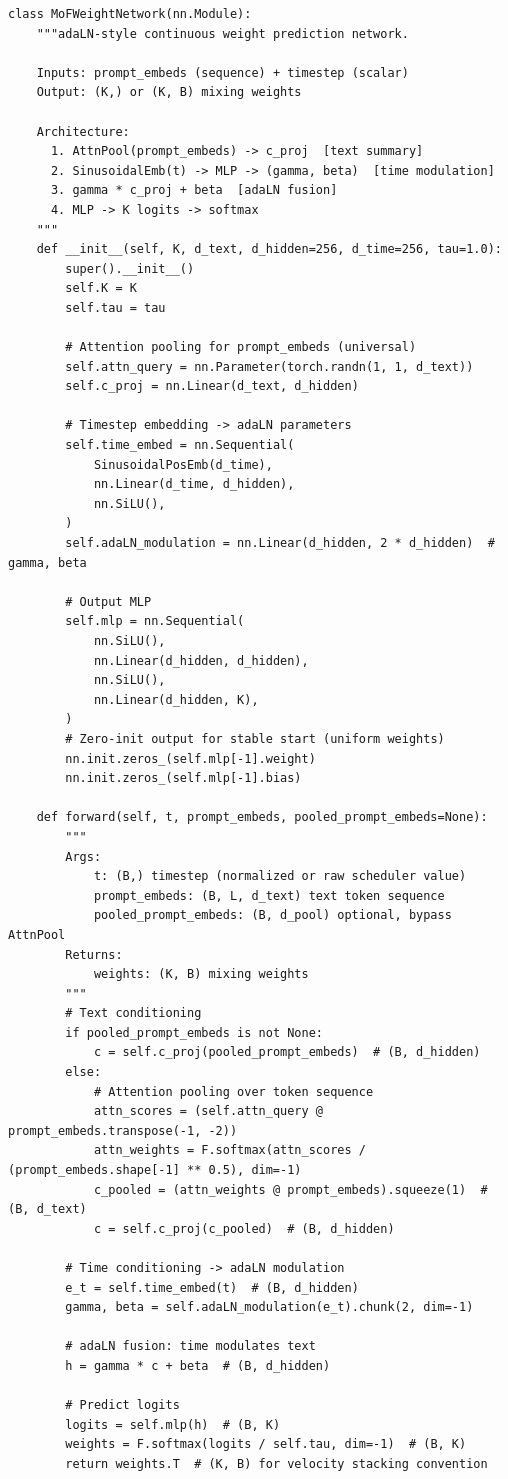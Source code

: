 \documentclass[11pt,a4paper]{article}
\theoremstyle{definition}
\begin{document}
\begin{verbatim}
class MoFWeightNetwork(nn.Module):
    """adaLN-style continuous weight prediction network.

    Inputs: prompt_embeds (sequence) + timestep (scalar)
    Output: (K,) or (K, B) mixing weights

    Architecture:
      1. AttnPool(prompt_embeds) -> c_proj  [text summary]
      2. SinusoidalEmb(t) -> MLP -> (gamma, beta)  [time modulation]
      3. gamma * c_proj + beta  [adaLN fusion]
      4. MLP -> K logits -> softmax
    """
    def __init__(self, K, d_text, d_hidden=256, d_time=256, tau=1.0):
        super().__init__()
        self.K = K
        self.tau = tau

        # Attention pooling for prompt_embeds (universal)
        self.attn_query = nn.Parameter(torch.randn(1, 1, d_text))
        self.c_proj = nn.Linear(d_text, d_hidden)

        # Timestep embedding -> adaLN parameters
        self.time_embed = nn.Sequential(
            SinusoidalPosEmb(d_time),
            nn.Linear(d_time, d_hidden),
            nn.SiLU(),
        )
        self.adaLN_modulation = nn.Linear(d_hidden, 2 * d_hidden)  # gamma, beta

        # Output MLP
        self.mlp = nn.Sequential(
            nn.SiLU(),
            nn.Linear(d_hidden, d_hidden),
            nn.SiLU(),
            nn.Linear(d_hidden, K),
        )
        # Zero-init output for stable start (uniform weights)
        nn.init.zeros_(self.mlp[-1].weight)
        nn.init.zeros_(self.mlp[-1].bias)

    def forward(self, t, prompt_embeds, pooled_prompt_embeds=None):
        """
        Args:
            t: (B,) timestep (normalized or raw scheduler value)
            prompt_embeds: (B, L, d_text) text token sequence
            pooled_prompt_embeds: (B, d_pool) optional, bypass AttnPool
        Returns:
            weights: (K, B) mixing weights
        """
        # Text conditioning
        if pooled_prompt_embeds is not None:
            c = self.c_proj(pooled_prompt_embeds)  # (B, d_hidden)
        else:
            # Attention pooling over token sequence
            attn_scores = (self.attn_query @ prompt_embeds.transpose(-1, -2))
            attn_weights = F.softmax(attn_scores / (prompt_embeds.shape[-1] ** 0.5), dim=-1)
            c_pooled = (attn_weights @ prompt_embeds).squeeze(1)  # (B, d_text)
            c = self.c_proj(c_pooled)  # (B, d_hidden)

        # Time conditioning -> adaLN modulation
        e_t = self.time_embed(t)  # (B, d_hidden)
        gamma, beta = self.adaLN_modulation(e_t).chunk(2, dim=-1)

        # adaLN fusion: time modulates text
        h = gamma * c + beta  # (B, d_hidden)

        # Predict logits
        logits = self.mlp(h)  # (B, K)
        weights = F.softmax(logits / self.tau, dim=-1)  # (B, K)
        return weights.T  # (K, B) for velocity stacking convention
\end{verbatim}
\end{document}
